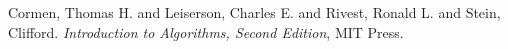 \begin{thebibliography}{10}

 Cormen, Thomas H. and Leiserson, Charles E. and Rivest, Ronald L. and Stein, Clifford. \textit{Introduction to Algorithms, Second Edition}, MIT Press.  
\end{thebibliography}